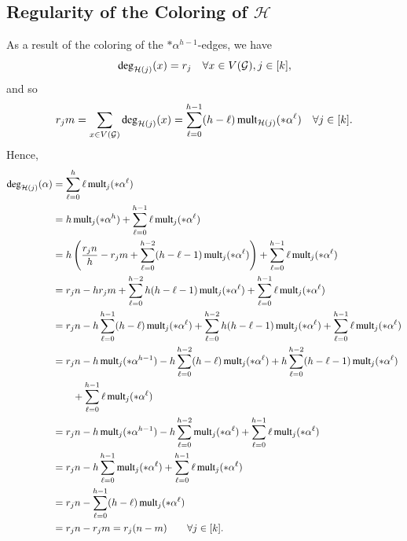 \documentclass[12pt,oneside]{amsart}
\newcommand\mult{\operatorname{\textup{{\fontfamily{ptm}\selectfont mult}}}}
\newcommand\dg{\operatorname{\textup{{\fontfamily{ptm}\selectfont deg}}}}
\newcommand{\cc}{\mathcal}
\begin{document}
\subsection{Regularity of the Coloring of  \texorpdfstring{$\bm{\cc H}$}{p}} \label{coloringIVsubsec}
As a result of the coloring of the $*\alpha^{h-1}$-edges, we have
\begin{equation} \label{degreepart1}
    \dg_{\cc H(j)}(x) = r_j \quad \forall x\in V(\cc G), j\in [k],
\end{equation}
and so
\begin{align} \label{rjmsum}
r_j m = \sum_{x\in V(\cc G)} \dg_{\cc H(j)}(x) = \sum_{\ell=0}^{h-1}(h-\ell)\mult_{\cc H(j)}(*\alpha^{\ell})\quad  \forall j\in [k].    
\end{align}
Hence,
\begin{align*}
    \dg_{\cc H(j)}(\alpha) &= \sum_{\ell=0}^h \ell\mult_j(*\alpha^{\ell})\\
    &= h\mult_j(*\alpha^h) + \sum_{\ell=0}^{h-1}\ell\mult_j(*\alpha^{\ell})\\
    &= h\left(\frac{r_jn}{h} - r_jm + \sum_{\ell=0}^{h-2}(h-\ell-1)\mult_j(*\alpha^{\ell})\right) + \sum_{\ell=0}^{h-1}\ell\mult_j(*\alpha^{\ell})\\
    &= r_jn - hr_jm + \sum_{\ell=0}^{h-2}h(h-\ell-1)\mult_j(*\alpha^{\ell}) + \sum_{\ell=0}^{h-1}\ell\mult_j(*\alpha^{\ell})\\
    &= r_jn - h\sum_{\ell=0}^{h-1}(h-\ell)\mult_j(*\alpha^{\ell}) + \sum_{\ell=0}^{h-2}h(h-\ell-1)\mult_j(*\alpha^{\ell}) + \sum_{\ell=0}^{h-1}\ell\mult_j(*\alpha^{\ell})\\
    &= r_jn - h\mult_j(*\alpha^{h-1}) - h\sum_{\ell=0}^{h-2}(h-\ell)\mult_j(*\alpha^{\ell}) + h\sum_{\ell=0}^{h-2}(h-\ell-1)\mult_j(*\alpha^{\ell})\\
    &\qquad+ \sum_{\ell=0}^{h-1}\ell\mult_j(*\alpha^{\ell})\\
    &= r_jn - h\mult_j(*\alpha^{h-1}) - h\sum_{\ell=0}^{h-2}\mult_j(*\alpha^{\ell}) + \sum_{\ell=0}^{h-1}\ell\mult_j(*\alpha^{\ell})\\
    &= r_jn - h\sum_{\ell=0}^{h-1}\mult_j(*\alpha^{\ell}) + \sum_{\ell=0}^{h-1}\ell\mult_j(*\alpha^{\ell})\\
    &= r_jn - \sum_{\ell=0}^{h-1}(h-\ell)\mult_j(*\alpha^{\ell})\\
    &= r_j n - r_j m = r_j(n-m) \qquad \forall j\in [k].
\end{align*}
\end{document}

